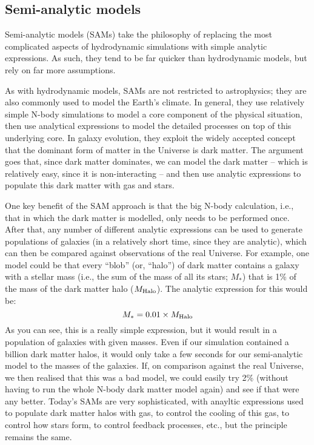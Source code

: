 \documentclass[11pt]{article}
\begin{document}
\subsection{Semi-analytic models}
Semi-analytic models (SAMs) take the philosophy of replacing the most
complicated aspects of hydrodynamic simulations with simple analytic
expressions. As such, they tend to be far quicker than hydrodynamic
models, but rely on far more assumptions.

As with hydrodynamic models, SAMs are not restricted to astrophysics;
they are also commonly used to model the Earth's climate. In general,
they use relatively simple N-body simulations to model a core
component of the physical situation, then use analytical expressions
to model the detailed processes on top of this underlying core. In
galaxy evolution, they exploit the widely accepted concept that the
dominant form of matter in the Universe is dark matter. The argument
goes that, since dark matter dominates, we can model the dark matter
-- which is relatively easy, since it is non-interacting -- and then
use analytic expressions to populate this dark matter with gas and
stars.

One key benefit of the SAM approach is that the big N-body
calculation, i.e., that in which the dark matter is modelled, only
needs to be performed once. After that, any number of different
analytic expressions can be used to generate populations of galaxies
(in a relatively short time, since they are analytic), which can then
be compared against observations of the real Universe. For example,
one model could be that every ``blob'' (or, ``halo'') of dark matter
contains a galaxy with a stellar mass (i.e., the sum of the mass of
all its stars; $M_\ast$) that is 1\% of the mass of the dark matter
halo ($M_{\rm Halo}$). The analytic expression for this would be:
\begin{equation}
  M_\ast = 0.01\times M_{\rm Halo}
\end{equation}
As you can see, this is a really simple expression, but it would
result in a population of galaxies with given masses. Even if our
simulation contained a billion dark matter halos, it would only take a
few seconds for our semi-analytic model to the masses of the
galaxies. If, on comparison against the real Universe, we then
realised that this was a bad model, we could easily try 2\% (without
having to run the whole N-body dark matter model again) and see if
that were any better. Today's SAMs are very sophisticated, with
anayltic expressions used to populate dark matter halos with gas, to
control the cooling of this gas, to control how stars form, to control
feedback processes, etc., but the principle remains the same.
\end{document}
